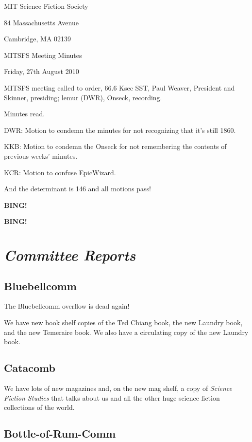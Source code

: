 \documentclass[10pt]{article}
\newcommand{\bing}{{\bf BING!} }
\newcommand{\goto}[1]{\bing \vskip 12pt \section*{{\em{#1}}}}
\newcommand{\skinner}{Paul Weaver, President and Skinner}
\newcommand{\onseck}{lemur (DWR), Onseck}
\newcommand{\meetingdate}{Friday, 27th August 2010}
\begin{document}
\begin{center}

MIT Science Fiction Society

84 Massachusetts Avenue

Cambridge, MA 02139

\vspace{12pt}

MITSFS Meeting Minutes

\meetingdate

\end{center}

\vspace{18pt}

\setlength{\parskip}{6pt}

\noindent
MITSFS meeting called to order, 66.6 Ksec SST,
\skinner, presiding; \onseck, recording.

Minutes read.

DWR: Motion to condemn the minutes for not recognizing that it's still
1860.

KKB: Motion to condemn the Onseck for not remembering the contents
of previous weeks' minutes.

KCR: Motion to confuse EpicWizard.

And the determinant is 146 and all motions pass!

\bing

\goto{Committee Reports}

\subsection*{Bluebellcomm}

The Bluebellcomm overflow is dead again!

We have new book shelf copies of the Ted Chiang book, the new Laundry
book, and the new Temeraire book.  We also have a circulating copy
of the new Laundry book.

\subsection*{Catacomb}

We have lots of new magazines and, on the new mag shelf, a copy of
\emph{Science Fiction Studies} that talks about us and all
the other huge science fiction collections of the world.

\subsection*{Bottle-of-Rum-Comm}
\end{document}
